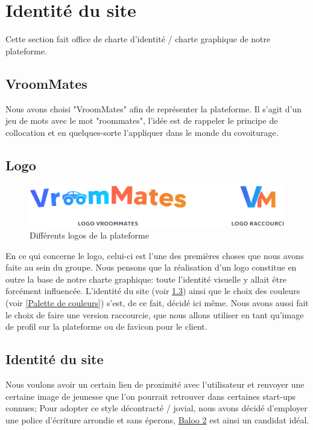 \section{Identité du site}

Cette section fait office de charte d'identité / charte graphique de notre plateforme.

\subsection{VroomMates}

Nous avons choisi "VroomMates" afin de représenter la plateforme. Il s'agit d'un jeu de mots avec le mot "roommates", l'idée est de rappeler le principe de collocation et en quelques-sorte l'appliquer dans le monde du covoiturage.

\subsection{Logo}

\begin{figure}[th]
\centering
\includegraphics[width=\linewidth]{medias/logos.png}
\decoRule
\caption{Différents logos de la plateforme}
\end{figure}

En ce qui concerne le logo, celui-ci est l'une des premières choses que nous avons faite au sein du groupe. Nous pensons que la réalisation d'un logo constitue en outre la base de notre charte graphique: toute l'identité visuelle y allait être forcément influencée. 
L'identité du site (voir \ref{Identité du site}) ainsi que le choix des couleurs (voir \ref{Palette de couleurs}) s'est, de ce fait, décidé ici même.
Nous avons aussi fait le choix de faire une version raccourcie, que nous allons utiliser en tant qu'image de profil sur la plateforme ou de favicon pour le client.

\subsection{Identité du site}
\label{Identité du site}


Nous voulons avoir un certain lien de proximité avec l'utilisateur et renvoyer une certaine image de jeunesse que l'on pourrait retrouver dans certaines start-ups connues;
Pour adopter ce style décontracté / jovial, nous avons décidé d'employer une police d'écriture arrondie et sans éperons, \href{https://fonts.google.com/specimen/Baloo+2}{Baloo 2} est ainsi un candidat idéal.

